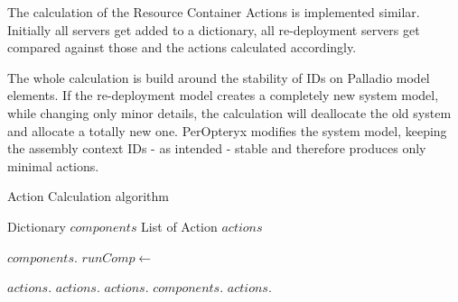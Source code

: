 The calculation of the Resource Container Actions is implemented similar. Initially all servers get added to a dictionary, all re-deployment servers get compared against those and the actions calculated accordingly.

The whole calculation is build around the stability of IDs on Palladio model elements. If the re-deployment model creates a completely new system model, while changing only minor details, the calculation will deallocate the old system and allocate a totally new one. PerOpteryx modifies the system model, keeping the assembly context IDs - as intended - stable and therefore produces only minimal actions.

\begin{algorithm}[H]
	\caption{Action Calculation algorithm}
	\label{algo:action_calc}
	\begin{algorithmic}[1]
		
		\State Dictionary $components$
		\State List of Action $actions$
		\State
		
		\State
		$components.$
		\EndFor
		\EndProcedure
		\State
		\State
		\State
		\State
		$runComp\gets $ 
		
		 \State
		$actions.$
		\Else
		\State $actions.$
		\EndIf
		\State $actions.$
		\EndIf
		\EndIf
		\State $components.$
		\EndFor
		\State
		\State $actions.$
		\EndFor
		\EndProcedure
	\end{algorithmic}
\end{algorithm}


